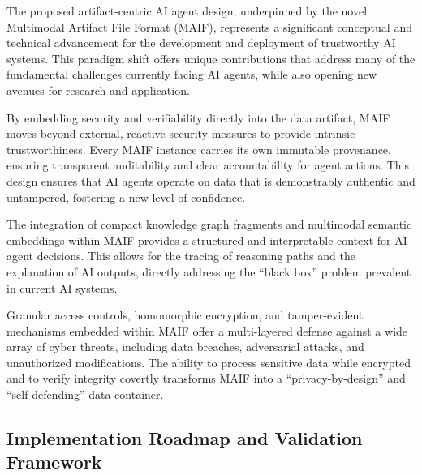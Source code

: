 \documentclass[conference]{IEEEtran}
\begin{document}
The proposed artifact-centric AI agent design, underpinned by the novel Multimodal Artifact File Format (MAIF), represents a significant conceptual and technical advancement for the development and deployment of trustworthy AI systems. This paradigm shift offers unique contributions that address many of the fundamental challenges currently facing AI agents, while also opening new avenues for research and application.

By embedding security and verifiability directly into the data artifact, MAIF moves beyond external, reactive security measures to provide intrinsic trustworthiness. Every MAIF instance carries its own immutable provenance, ensuring transparent auditability and clear accountability for agent actions\cite{ref4}. This design ensures that AI agents operate on data that is demonstrably authentic and untampered, fostering a new level of confidence.

The integration of compact knowledge graph fragments and multimodal semantic embeddings within MAIF provides a structured and interpretable context for AI agent decisions\cite{ref26}. This allows for the tracing of reasoning paths and the explanation of AI outputs, directly addressing the ``black box'' problem prevalent in current AI systems\cite{ref4}.

Granular access controls, homomorphic encryption, and tamper-evident mechanisms embedded within MAIF offer a multi-layered defense against a wide array of cyber threats, including data breaches, adversarial attacks, and unauthorized modifications\cite{ref69}. The ability to process sensitive data while encrypted and to verify integrity covertly transforms MAIF into a ``privacy-by-design'' and ``self-defending'' data container.


\subsection{Implementation Roadmap and Validation Framework}
\end{document}
